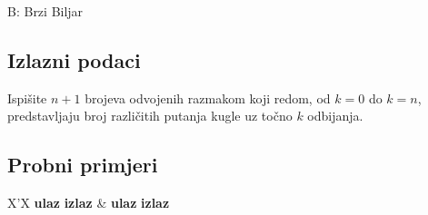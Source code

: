 \begin{statement}[
  timelimit=1 s,
  memorylimit=512 MiB,
]{B: Brzi Biljar}
\subsection*{Izlazni podaci}
Ispišite $n+1$ brojeva odvojenih razmakom koji redom, od $k=0$ do $k=n$,
predstavljaju broj različitih putanja kugle uz točno $k$ odbijanja.

\subsection*{Probni primjeri}
\begin{tabularx}{\textwidth}{X'X}
  \textbf{ulaz}
  \linespread{1}{}
  \textbf{izlaz}
  \linespread{1}{} &
  \textbf{ulaz}
  \linespread{1}{}
  \textbf{izlaz}
  \linespread{1}{}
\end{tabularx}

\end{statement}

